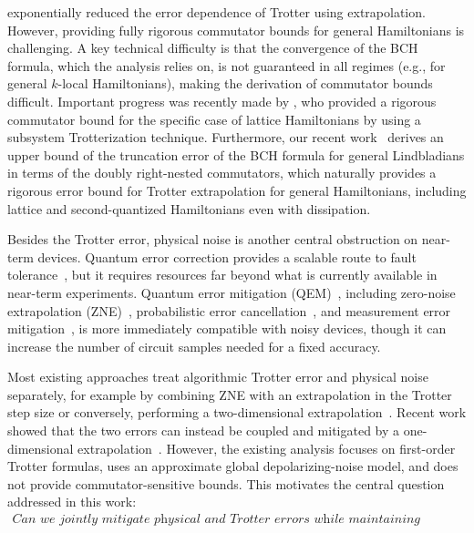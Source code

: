 \documentclass[aps,pra,reprint,groupedaddress,floatfix]{revtex4-2}
\begin{document}
\citet{watson2025exponentially} exponentially reduced the error dependence of Trotter using extrapolation. However, providing fully rigorous commutator bounds for general Hamiltonians is challenging. A key technical difficulty is that the convergence of the BCH formula, which the analysis relies on, is not guaranteed in all regimes (e.g., for general $k$-local Hamiltonians), making the derivation of commutator bounds difficult. Important progress was recently made by \citet{mizuta2025commutator}, who provided a rigorous commutator bound for the specific case of lattice Hamiltonians by using a subsystem Trotterization technique.
Furthermore, our recent work~\cite{wang2026lindbladiansimulationcommutatorbounds} derives an upper bound of the truncation error of the BCH formula for general Lindbladians in terms of the doubly right-nested commutators, which naturally provides a rigorous error bound for Trotter extrapolation for general Hamiltonians, including lattice and second-quantized Hamiltonians even with dissipation.

Besides the Trotter error, physical noise is another central obstruction on near-term devices. Quantum error correction provides a scalable route to fault tolerance~\cite{Terhal_2015}, but it requires resources far beyond what is currently available in near-term experiments. Quantum error mitigation (QEM)~\cite{cai2023quantum}, including zero-noise extrapolation (ZNE)~\cite{li2017efficient, PhysRevLett.119.180509}, probabilistic error cancellation~\cite{EndoBenjaminLi2018, berg_probabilistic_2023}, and measurement error mitigation~\cite{Bravyi2021measurement, Nation2021scalable}, is more immediately compatible with noisy devices, though it can increase the number of circuit samples needed for a fixed accuracy.


Most existing approaches treat algorithmic Trotter error and physical noise separately, for example by combining ZNE with an extrapolation in the Trotter step size or conversely, performing a two-dimensional extrapolation~\cite{vazquez2023well}. Recent work showed that the two errors can instead be coupled and mitigated by a one-dimensional extrapolation~\cite{hakkaku2025dataefficienterrormitigationphysical}. However, the existing analysis focuses on first-order Trotter formulas, uses an approximate global depolarizing-noise model, and does not provide commutator-sensitive bounds. This motivates the central question addressed in this work:
\begin{align*}
    \textit{Can we jointly mitigate physical and Trotter errors while maintaining commutator scaling?}
\end{align*}
\end{document}
